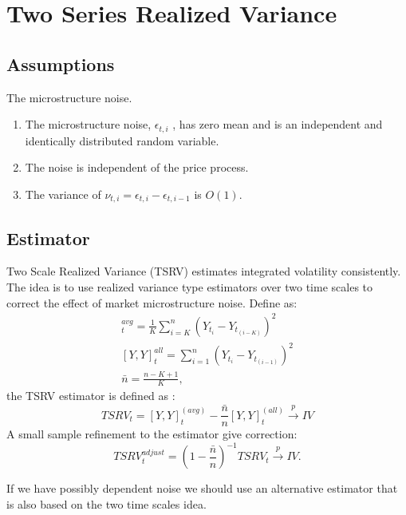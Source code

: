 \documentclass[letterpaper]{report}
\begin{document}
 
 
\section{Two Series Realized Variance}
\subsection{Assumptions}
The microstructure noise.
\begin{enumerate}
\item The microstructure noise, $\epsilon_{t,i}$ , has zero mean and is an
independent and identically distributed random variable.
\item The noise is independent of the price process.
\item  The variance of $\nu_{t,i} = \epsilon_{t,i} - \epsilon_{t,i-1}$ is
$O(1)$.
\end{enumerate}
\subsection{Estimator}
Two Scale Realized Variance (TSRV) estimates
integrated volatility consistently. The idea is to use realized variance
type estimators over two time scales to correct the effect of market
microstructure noise. Define as:
\begin{gather}
[Y,Y]^{avg}_t = \frac{1}{K}\sum_{i=K}^n(Y_{t_i} - Y_{t_{(i-K)}})^2\\
[Y,Y]^{all}_t = \sum_{i=1}^n(Y_{t_i} - Y_{t_{(i-1)}})^2\\
\bar{n}=\frac{n-K+1}{K},
\end{gather}
the TSRV estimator is defined as \cite[Zu and Boswijk, 2008]{Zu_Boswijk}:
\begin{equation}
\label{TSRV}
TSRV_t=[Y,Y]^{(avg)}_t - \frac{\bar{n}}{n}[Y,Y]^{(all)}_t \stackrel{p}{\to} IV
\end{equation}
A small sample refinement to the estimator give correction:
\begin{equation}
TSRV_t^{adjust}=\left( 1-\frac{\bar{n}}{n}\right)^{-1} TSRV_t \stackrel{p}{\to} IV.
\end{equation}

\noindent If we have possibly dependent noise we should use an alternative estimator that
is also based on the two time scales idea.
\end{document}
